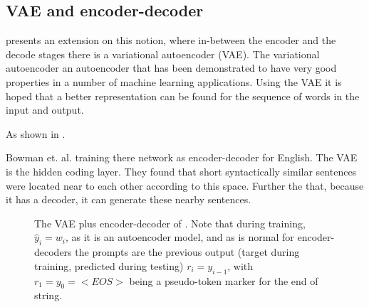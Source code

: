 \documentclass[12pt,parskip]{komatufte}
\begin{document}
\subsection{VAE and encoder-decoder}
 presents an extension on this notion,
where in-between the encoder and the decode stages there is a variational autoencoder (VAE).
The variational autoencoder  an autoencoder that has been demonstrated to have very good properties in a number of machine learning applications.
Using the VAE it is hoped that a better representation can be found for the sequence of words in the input and output.

As shown in .

Bowman et. al. training there network as encoder-decoder for English.
The VAE is the hidden coding layer. 
They found that short syntactically similar sentences were located near to each other according to this space.
Further the that, because it has a decoder, it can generate these nearby sentences.

\begin{figure}
	\caption{The VAE plus encoder-decoder of \textcite{Bowman2015SmoothGeneration}.
		Note that during training, $\hat{y}_i=w_i$, as it is an autoencoder model,
		and as is normal for encoder-decoders the prompts are the previous output (target during training, predicted during testing) $r_i=y_{i-1}$,
		with $r_1=y_0=<EOS>$ being a pseudo-token marker for the end of string.
	}
	\label{fig:bowman}
	
	
	
\end{figure}
\end{document}
